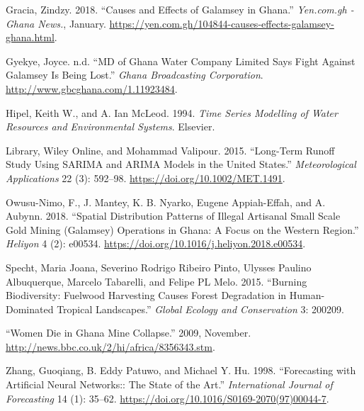 \documentclass[
  onepage,
  openany]{scrbook}
\newlength{\cslhangindent}
\newlength{\cslentryspacingunit} %
\newenvironment{CSLReferences}[2] %
 {%
  \setlength{\parindent}{0pt}
  \ifodd #1
  \let\oldpar\par
  \def\par{\hangindent=\cslhangindent\oldpar}
  \fi
  \setlength{\parskip}{#2\cslentryspacingunit}
 }%
 {}
\begin{document}
\begin{CSLReferences}{1}{0}
\leavevmode{}%
Gracia, Zindzy. 2018. {``Causes and Effects of Galamsey in Ghana.''}
\emph{Yen.com.gh - Ghana News.}, January.
\url{https://yen.com.gh/104844-causes-effects-galamsey-ghana.html}.

\leavevmode{}%
Gyekye, Joyce. n.d. {``MD of Ghana Water Company Limited Says Fight
Against Galamsey Is Being Lost.''} \emph{Ghana Broadcasting
Corporation}. \url{http://www.gbcghana.com/1.11923484}.

\leavevmode{}%
Hipel, Keith W., and A. Ian McLeod. 1994. \emph{Time Series Modelling of
Water Resources and Environmental Systems}. Elsevier.

\leavevmode{}%
Library, Wiley Online, and Mohammad Valipour. 2015. {``Long-Term Runoff
Study Using SARIMA and ARIMA Models in the United States.''}
\emph{Meteorological Applications} 22 (3): 592--98.
\url{https://doi.org/10.1002/MET.1491}.

\leavevmode{}%
Owusu-Nimo, F., J. Mantey, K. B. Nyarko, Eugene Appiah-Effah, and A.
Aubynn. 2018. {``Spatial Distribution Patterns of Illegal Artisanal
Small Scale Gold Mining (Galamsey) Operations in Ghana: A Focus on the
Western Region.''} \emph{Heliyon} 4 (2): e00534.
\url{https://doi.org/10.1016/j.heliyon.2018.e00534}.

\leavevmode{}%
Specht, Maria Joana, Severino Rodrigo Ribeiro Pinto, Ulysses Paulino
Albuquerque, Marcelo Tabarelli, and Felipe PL Melo. 2015. {``Burning
Biodiversity: Fuelwood Harvesting Causes Forest Degradation in
Human-Dominated Tropical Landscapes.''} \emph{Global Ecology and
Conservation} 3: 200209.

\leavevmode{}%
{``Women Die in Ghana Mine Collapse.''} 2009, November.
\url{http://news.bbc.co.uk/2/hi/africa/8356343.stm}.

\leavevmode{}%
Zhang, Guoqiang, B. Eddy Patuwo, and Michael Y. Hu. 1998. {``Forecasting
with Artificial Neural Networks:: The State of the Art.''}
\emph{International Journal of Forecasting} 14 (1): 35--62.
\url{https://doi.org/10.1016/S0169-2070(97)00044-7}.

\end{CSLReferences}


\backmatter
\end{document}
